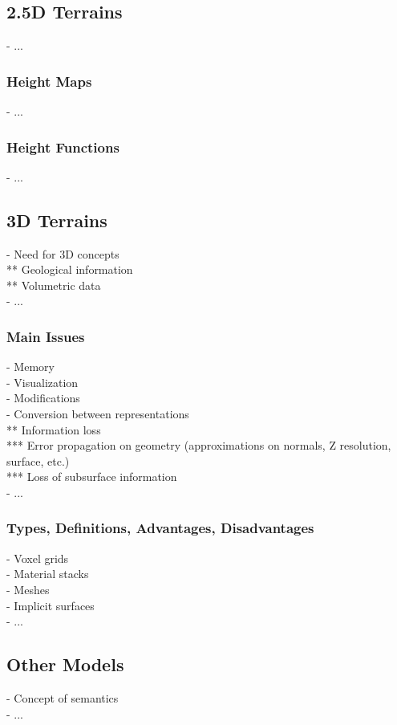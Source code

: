 \subsection{2.5D Terrains}
- ...

\subsubsection{Height Maps}
- ...

\subsubsection{Height Functions}
- ...

\subsection{3D Terrains}
- Need for 3D concepts \\
** Geological information \\
** Volumetric data \\
- ...

\subsubsection{Main Issues}
- Memory \\
- Visualization \\
- Modifications \\
- Conversion between representations \\
** Information loss \\
*** Error propagation on geometry (approximations on normals, Z resolution, surface, etc.) \\
*** Loss of subsurface information \\
- ...

\subsubsection{Types, Definitions, Advantages, Disadvantages}
- Voxel grids \\
- Material stacks \\
- Meshes \\
- Implicit surfaces \\
- ...

\subsection{Other Models}
- Concept of semantics \\
- ...

